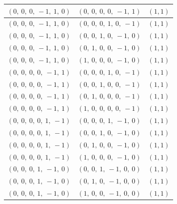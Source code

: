\documentclass[11pt]{article}
\theoremstyle{definition}
\begin{document}
\begin{center}
\begin{tabular}{|l|l|c|}
    \hline
    $\left( 0, \  0, \  0, \  -1, \  1, \  0\right)$ & $\left( 0, \  0, \  0, \  0, \  -1, \  1\right)$ & $(1,1)$ \\
    \hline
    $\left( 0, \  0, \  0, \  -1, \  1, \  0\right)$ & $\left( 0, \  0, \  0, \  1, \  0, \  -1\right)$ & $(1,1)$ \\
    \hline
    $\left( 0, \  0, \  0, \  -1, \  1, \  0\right)$ & $\left( 0, \  0, \  1, \  0, \  -1, \  0\right)$ & $(1,1)$ \\
    \hline
    $\left( 0, \  0, \  0, \  -1, \  1, \  0\right)$ & $\left( 0, \  1, \  0, \  0, \  -1, \  0\right)$ & $(1,1)$ \\
    \hline
    $\left( 0, \  0, \  0, \  -1, \  1, \  0\right)$ & $\left( 1, \  0, \  0, \  0, \  -1, \  0\right)$ & $(1,1)$ \\
    \hline
    $\left( 0, \  0, \  0, \  0, \  -1, \  1\right)$ & $\left( 0, \  0, \  0, \  1, \  0, \  -1\right)$ & $(1,1)$ \\
    \hline
    $\left( 0, \  0, \  0, \  0, \  -1, \  1\right)$ & $\left( 0, \  0, \  1, \  0, \  0, \  -1\right)$ & $(1,1)$ \\
    \hline
    $\left( 0, \  0, \  0, \  0, \  -1, \  1\right)$ & $\left( 0, \  1, \  0, \  0, \  0, \  -1\right)$ & $(1,1)$ \\
    \hline
    $\left( 0, \  0, \  0, \  0, \  -1, \  1\right)$ & $\left( 1, \  0, \  0, \  0, \  0, \  -1\right)$ & $(1,1)$ \\
    \hline
    $\left( 0, \  0, \  0, \  0, \  1, \  -1\right)$ & $\left( 0, \  0, \  0, \  1, \  -1, \  0\right)$ & $(1,1)$ \\
    \hline
    $\left( 0, \  0, \  0, \  0, \  1, \  -1\right)$ & $\left( 0, \  0, \  1, \  0, \  -1, \  0\right)$ & $(1,1)$ \\
    \hline
    $\left( 0, \  0, \  0, \  0, \  1, \  -1\right)$ & $\left( 0, \  1, \  0, \  0, \  -1, \  0\right)$ & $(1,1)$ \\
    \hline
    $\left( 0, \  0, \  0, \  0, \  1, \  -1\right)$ & $\left( 1, \  0, \  0, \  0, \  -1, \  0\right)$ & $(1,1)$ \\
    \hline
    $\left( 0, \  0, \  0, \  1, \  -1, \  0\right)$ & $\left( 0, \  0, \  1, \  -1, \  0, \  0\right)$ & $(1,1)$ \\
    \hline
    $\left( 0, \  0, \  0, \  1, \  -1, \  0\right)$ & $\left( 0, \  1, \  0, \  -1, \  0, \  0\right)$ & $(1,1)$ \\
    \hline
    $\left( 0, \  0, \  0, \  1, \  -1, \  0\right)$ & $\left( 1, \  0, \  0, \  -1, \  0, \  0\right)$ & $(1,1)$ \\

\end{tabular}
\end{center}
\end{document}
